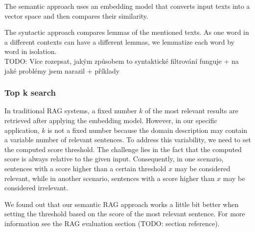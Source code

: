 The semantic approach uses an embedding model that converts input texts into a vector space and then compares their similarity.

The syntactic approach compares lemmas of the mentioned texts. As one word in a different contexts can have a different lemmas, we lemmatize each word by word in isolation. \\

TODO: Více rozepsat, jakým způsobem to syntaktické filtrování funguje + na jaké problémy jsem narazil + příklady


\subsubsection{Top k search}

In traditional RAG systems, a fixed number $k$ of the most relevant results are retrieved after applying the embedding model. However, in our specific application, $k$ is not a fixed number because the domain description may contain a variable number of relevant sentences. To address this variability, we need to set the computed score threshold. The challenge lies in the fact that the computed score is always relative to the given input. Consequently, in one scenario, sentences with a score higher than a certain threshold $x$ may be considered relevant, while in another scenario, sentences with a score higher than $x$ may be considered irrelevant.

We found out that our semantic RAG approach works a little bit better when setting the threshold based on the score of the most relevant sentence. For more information see the RAG evaluation section (TODO: section reference).

